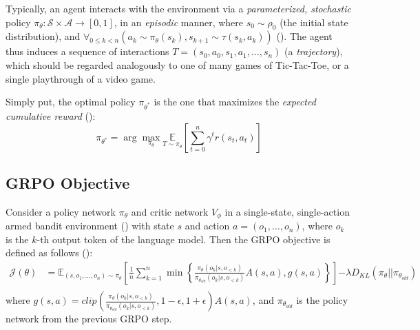 \documentclass{article} %
\theoremstyle{definition}
\begin{document}
Typically, an agent interacts with the environment 
via a \textit{parameterized, stochastic} policy $\pi_\theta: \mathcal{S} \times \mathcal{A} \rightarrow [0, 1]$,
in an \textit{episodic} manner, where $s_0 \sim \rho_0$ (the initial state distribution),
and $\forall_{0 \leq k < n}\left(a_{k} \sim \pi_\theta(s_k), s_{k+1} \sim \tau(s_k, a_{k})\right)$ (\cite{wk1}). 
The agent thus induces a sequence of interactions $T = (s_0, a_0, s_1, a_1, \ldots, s_n)$
(a \textit{trajectory}), which should be regarded analogously to one
of many games of Tic-Tac-Toe, or a single playthrough of a video game.

Simply put, the optimal policy $\pi_{\theta^{*}}$ is the one that maximizes the \textit{expected cumulative reward} (\cite{wk2}):
\begin{equation} \label{eq:rl-obj}
    \pi_{\theta^{*}} = {\displaystyle \arg\max_{\pi_\theta} \underset{T \sim \pi_{\theta}}{\mathbb{E}} \left[ \sum_{t=0}^{n} \gamma^t r(s_t, a_t) \right] }
\end{equation}

\subsection{GRPO Objective}
\label{sec:grpo-obj}

Consider a policy network $\pi_\theta$ and critic network $V_\phi$ in a single-state,
single-action armed bandit environment (\cite{Sutton-and-Barto-1998, contextualbandit}) 
with state $s$ and action $a = (o_1, \dots, o_n)$,
where $o_k$ is the $k$-th output token of the language model.
Then the GRPO objective is defined as follows (\cite{grpo, wk10}):
\begin{equation}
    \label{eq:grpo-obj}
    \begin{array}{rl}
        \mathcal{J}(\theta) &= \mathbb{E}_{(s, o_1, \dots, o_n) \sim \pi_\theta} \left[ 
            \displaystyle
            \frac{1}{n} \sum_{k = 1}^n \min \left\{
                \frac{\pi_\theta(o_k|s, o_{< k})}{\pi_{\theta_{old}}(o_k|s, o_{< k})} A(s, a),
                g(s, a)
            \right\}
        \right] {\displaystyle - \lambda D_{KL}(\pi_\theta || \pi_{\theta_{old}})} \\
    \end{array}
\end{equation}
where ${\displaystyle g(s, a) = clip\left(\frac{\pi_\theta(o_k|s, o_{< k})}{\pi_{\theta_{old}}(o_k|s, o_{< k})}, 1 - \epsilon, 1 + \epsilon \right) A(s, a)}$,
and $\pi_{\theta_{old}}$ is the policy network from the previous GRPO step.
\end{document}
